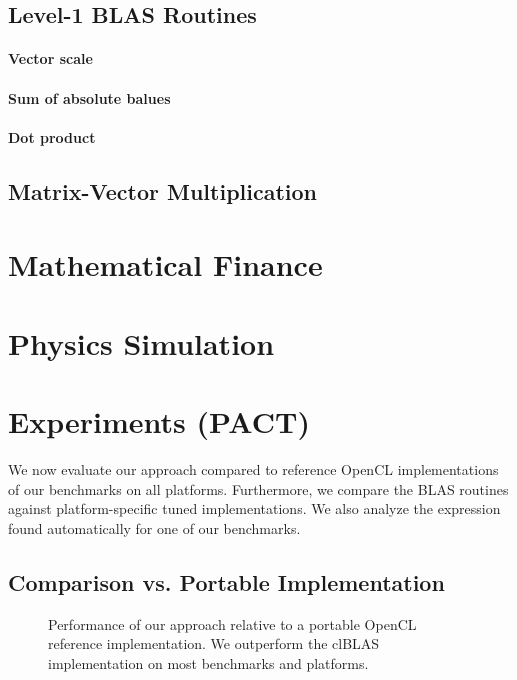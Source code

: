   \subsection{Level-1 BLAS Routines}

    \paragraph{Vector scale}

    \paragraph{Sum of absolute balues}

    \paragraph{Dot product}

  \subsection{Matrix-Vector Multiplication}

\section{Mathematical Finance}

\section{Physics Simulation}

\section{Experiments (PACT)}

We now evaluate our approach compared to reference OpenCL implementations of our benchmarks on all platforms.
Furthermore, we compare the BLAS routines against platform-specific tuned implementations.
We also analyze the expression found automatically for one of our benchmarks.




\subsection{Comparison vs. Portable Implementation}

\begin{figure}[t]
  \caption{Performance of our approach relative to a portable OpenCL reference implementation.
           We outperform the clBLAS implementation on most benchmarks and platforms.}
  \label{fig:clblas}
\end{figure}

